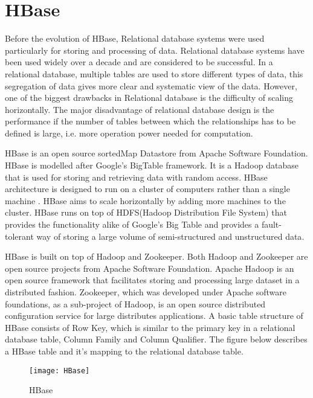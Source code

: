 \documentclass[11pt,a4paper,bibtotoc,idxtotoc,headsepline,footsepline,footexclude,BCOR12mm,DIV13]{scrbook}
\begin{document}
\newpage
\section{HBase}
\label{sec:hbase}

Before the evolution of HBase, Relational database systems were used particularly for storing and processing of data. Relational database systems have been used widely over a decade and are considered to be successful. In a relational database, multiple tables are used to store different types of data, this segregation of data gives more clear and systematic view of the data\cite{relational:dbs}. However, one of the biggest drawbacks in Relational database is the difficulty of scaling horizontally. The major disadvantage of relational database design is the performance if the number of tables between which the relationships has to be defined is large, i.e. more operation power needed for computation\cite{relational:dbs}. 

HBase is an open source sortedMap Datastore from Apache Software Foundation. HBase is modelled after Google's BigTable framework. It is a Hadoop database that is used for storing and retrieving data with random access. HBase architecture is designed to run on a cluster of computers rather than a single machine \cite{coprocessor:detail}. HBase aims to scale horizontally by adding more machines to the cluster. HBase runs on top of HDFS(Hadoop Distribution File System) that provides the functionality alike of Google's Big Table and provides a fault-tolerant way of storing a large volume of semi-structured and unstructured data\cite{bigdata:analysis}.

HBase is built on top of Hadoop and Zookeeper\cite{coprocessor:detail}. Both Hadoop and Zookeeper are open source projects from Apache Software Foundation. Apache Hadoop is an open source framework that facilitates storing and processing large dataset in a distributed fashion. Zookeeper, which was developed under Apache software foundations, as a sub-project of Hadoop, is an open source distributed configuration service for large distributes applications. A basic table structure of HBase consists of Row Key, which is similar to the primary key in a relational database table, Column Family and Column Qualifier. The figure below describes a HBase table and it's mapping to the relational database table.


\begin{figure}
	\centering
	\texttt{[image: HBase]}
	\caption{HBase}
	\label{fig:HBase}
\end{figure}
\end{document}
